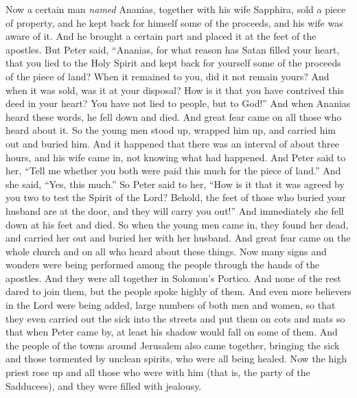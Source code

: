 \begin{biblechapter} %
 Now a certain man \textit{named} Ananias, together with his wife Sapphira, sold a piece of property,
\verse and he kept back for himself some of the proceeds, and his wife was aware of it. And he brought a certain part and placed it at the feet of the apostles.
\verse But Peter said, “Ananias, for what reason has Satan filled your heart, that you lied to the Holy Spirit and kept back for yourself some of the proceeds of the piece of land?
\verse When it remained to you, did it not remain yours? And when it was sold, was it at your disposal? How is it that you have contrived this deed in your heart? You have not lied to people, but to God!”
\verse And when Ananias heard these words, he fell down and died. And great fear came on all those who heard about it.
\verse So the young men stood up, wrapped him up, and carried him out and buried him.
\verse And it happened that there was an interval of about three hours, and his wife came in, not knowing what had happened.
\verse And Peter said to her, “Tell me whether you both were paid this much for the piece of land.” And she said, “Yes, this much.”
\verse So Peter said to her, “How is it that it was agreed by you two to test the Spirit of the Lord? Behold, the feet of those who buried your husband are at the door, and they will carry you out!”
\verse And immediately she fell down at his feet and died. So when the young men came in, they found her dead, and carried her out and buried her with her husband.
\verse And great fear came on the whole church and on all who heard about these things.
 Now many signs and wonders were being performed among the people through the hands of the apostles. And they were all together in Solomon’s Portico.
\verse And none of the rest dared to join them, but the people spoke highly of them.
\verse And even more believers in the Lord were being added, large numbers of both men and women,
\verse so that they even carried out the sick into the streets and put them on cots and mats so that when Peter came by, at least his shadow would fall on some of them.
\verse And the people of the towns around Jerusalem also came together, bringing the sick and those tormented by unclean spirits, who were all being healed.
 Now the high priest rose up and all those who were with him (that is, the party of the Sadducees), and they were filled with jealousy.

\end{biblechapter}
